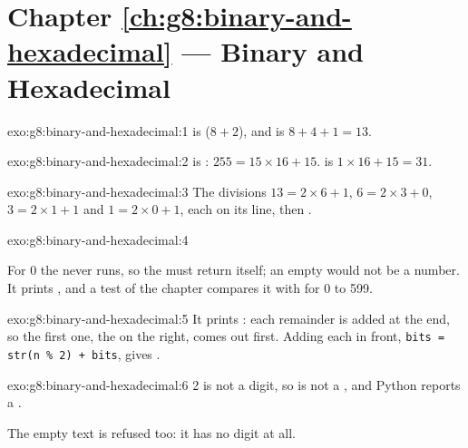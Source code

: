 \section*{Chapter \ref{ch:g8:binary-and-hexadecimal} --- Binary and Hexadecimal}

\begin{solution}{exo:g8:binary-and-hexadecimal:1}
 is  ($8 + 2$), and  is
$8 + 4 + 1 = 13$.
\end{solution}

\begin{solution}{exo:g8:binary-and-hexadecimal:2}
 is : $255 = 15 \times 16 + 15$. 
is $1 \times 16 + 15 = 31$.
\end{solution}

\begin{solution}{exo:g8:binary-and-hexadecimal:3}
The divisions $13 = 2 \times 6 + 1$, $6 = 2 \times 3 + 0$, $3 = 2 \times 1 + 1$
and $1 = 2 \times 0 + 1$, each on its line, then .
\end{solution}

\begin{solution}{exo:g8:binary-and-hexadecimal:4}
\label{lst:g8:binary-and-hexadecimal:sol-to-binary}

For 0 the  never runs, so the  must return  itself; an
empty  would not be a number. It prints , and a
test of the chapter compares it with  for 0 to 599.
\end{solution}

\begin{solution}{exo:g8:binary-and-hexadecimal:5}
It prints : each remainder is added at the end, so the first one,
the  on the right, comes out first. Adding each  in front,
\texttt{bits = str(n \% 2) + bits}, gives .
\end{solution}

\begin{solution}{exo:g8:binary-and-hexadecimal:6}
2 is not a  digit, so  is not a , and Python
reports a .

\label{lst:g8:binary-and-hexadecimal:sol-is-binary}

The empty text is refused too: it has no digit at all.
\end{solution}


